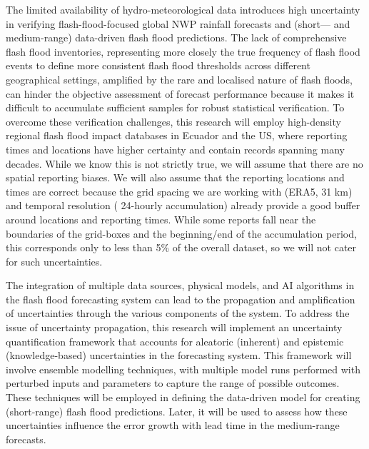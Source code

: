 The limited availability of hydro-meteorological data introduces high uncertainty in verifying flash-flood-focused global NWP rainfall forecasts and (short— and medium-range) data-driven flash flood predictions. The lack of comprehensive flash flood inventories, representing more closely the true frequency of flash flood events to define more consistent flash flood thresholds across different geographical settings, amplified by the rare and localised nature of flash floods, can hinder the objective assessment of forecast performance because it makes it difficult to accumulate sufficient samples for robust statistical verification. To overcome these verification challenges, this research will employ high-density regional flash flood impact databases in Ecuador and the US, where reporting times and locations have higher certainty and contain records spanning many decades. While we know this is not strictly true, we will assume that there are no spatial reporting biases. We will also assume that the reporting locations and times are correct because the grid spacing we are working with (ERA5, 31 km) and temporal resolution ( 24-hourly accumulation) already provide a good buffer around locations and reporting times. While some reports fall near the boundaries of the grid-boxes and the beginning/end of the accumulation period, this corresponds only to less than 5\% of the overall dataset, so we will not cater for such uncertainties. 

The integration of multiple data sources, physical models, and AI algorithms in the flash flood forecasting system can lead to the propagation and amplification of uncertainties through the various components of the system. To address the issue of uncertainty propagation, this research will implement an uncertainty quantification framework that accounts for aleatoric (inherent) and epistemic (knowledge-based) uncertainties in the forecasting system. This framework will involve ensemble modelling techniques, with multiple model runs performed with perturbed inputs and parameters to capture the range of possible outcomes. These techniques will be employed in defining the data-driven model for creating (short-range) flash flood predictions. Later, it will be used to assess how these uncertainties influence the error growth with lead time in the medium-range forecasts.
